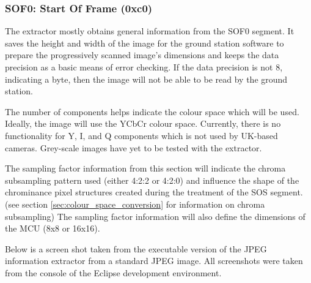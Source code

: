 \subsubsection{SOF0: Start Of Frame (0xc0)}

The extractor mostly obtains general information from the SOF0 segment. 
It saves the height and width of the image for the ground station
software to prepare the progressively scanned image's dimensions
and keeps the data precision as a basic means of error checking. 
If the data precision is not 8, indicating a byte, then the image will not
be able to be read by the ground station.

The number of components helps indicate the colour space which will
be used. Ideally, the image will use the YCbCr colour space. Currently,
there is no functionality for Y, I, and Q components  which is not
used by UK-based cameras. Grey-scale images have yet to be
tested with the extractor.

The sampling factor information from this section will indicate
the chroma subsampling pattern used (either 4:2:2 or 4:2:0)
and influence the shape of the chrominance pixel structures
created during the treatment of the SOS segment. 
(see section \ref{sec:colour_space_conversion}
for information on chroma subsampling) The 
sampling factor information will also define the dimensions of the
MCU (8x8 or 16x16).

Below is a screen shot taken from the executable version of
the JPEG information extractor from a standard JPEG image.
All screenshots were taken from the console of the Eclipse
development environment.

